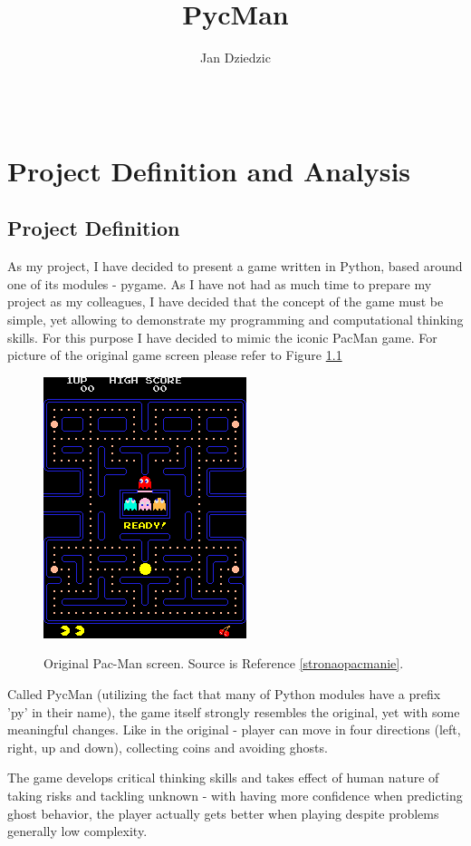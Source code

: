 \documentclass[11pt,a4paper]{report}
\author{Jan Dziedzic}
\title{PycMan}
\newenvironment{img}{
	\begin{center}
		\begin{figure}
			\begin{center}
			
}{
	\end{center}
		\end{figure}
			\end{center}
}
\begin{document}
	\maketitle
	\newpage
	\thispagestyle{empty}
	$$$$
	\newpage
	\thispagestyle{empty}
	\tableofcontents
	\chapter{Project Definition and Analysis}
		\newpage
		\section{Project Definition}
			As my project, I have decided to present a game written in Python, based around one of its modules - pygame. As I have not had as much time to prepare my project as my colleagues, I have decided that the concept of the game must be simple, yet allowing to demonstrate my programming and computational thinking skills. For this purpose I have decided to mimic the iconic PacMan game.
			For picture of the original game screen please refer to Figure \ref{oryg_pacman}
			
			\begin{img}
				\includegraphics{images/1_1}\\
				\caption{Original Pac-Man screen. Source is Reference \ref{stronaopacmanie}.}
				\label{oryg_pacman}
			\end{img}
		
			Called PycMan (utilizing the fact that many of Python modules have a prefix 'py' in their name), the game itself strongly resembles the original, yet with some meaningful changes. Like in the original - player can move in four directions (left, right, up and down), collecting coins and avoiding ghosts.
			
			
			The game develops critical thinking skills and takes effect of human nature of taking risks and tackling unknown - with having more confidence when predicting ghost behavior, the player actually gets better when playing despite problems generally low complexity.
			
\end{document}
